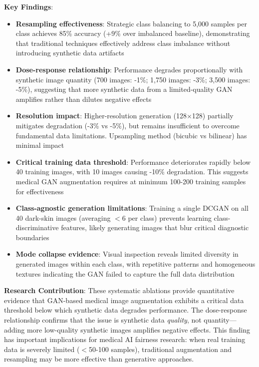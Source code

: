\documentclass[10pt, twocolumn, letterpaper]{article}
\begin{document}
\textbf{Key Findings}:
\begin{itemize}[leftmargin=*, itemsep=2pt]
    \item \textbf{Resampling effectiveness}: Strategic class balancing to 5,000 samples per class achieves 85\% accuracy (+9\% over imbalanced baseline), demonstrating that traditional techniques effectively address class imbalance without introducing synthetic data artifacts
    \item \textbf{Dose-response relationship}: Performance degrades proportionally with synthetic image quantity (700 images: -1\%; 1,750 images: -3\%; 3,500 images: -5\%), suggesting that more synthetic data from a limited-quality GAN amplifies rather than dilutes negative effects
    \item \textbf{Resolution impact}: Higher-resolution generation (128×128) partially mitigates degradation (-3\% vs -5\%), but remains insufficient to overcome fundamental data limitations. Upsampling method (bicubic vs bilinear) has minimal impact
    \item \textbf{Critical training data threshold}: Performance deteriorates rapidly below 40 training images, with 10 images causing -10\% degradation. This suggests medical GAN augmentation requires at minimum 100-200 training samples for effectiveness
    \item \textbf{Class-agnostic generation limitations}: Training a single DCGAN on all 40 dark-skin images (averaging $<$6 per class) prevents learning class-discriminative features, likely generating images that blur critical diagnostic boundaries
    \item \textbf{Mode collapse evidence}: Visual inspection reveals limited diversity in generated images within each class, with repetitive patterns and homogeneous textures indicating the GAN failed to capture the full data distribution
\end{itemize}

\textbf{Research Contribution}: These systematic ablations provide quantitative evidence that GAN-based medical image augmentation exhibits a critical data threshold below which synthetic data degrades performance. The dose-response relationship confirms that the issue is synthetic data \textit{quality}, not quantity—adding more low-quality synthetic images amplifies negative effects. This finding has important implications for medical AI fairness research: when real training data is severely limited ($<$50-100 samples), traditional augmentation and resampling may be more effective than generative approaches.
\end{document}
